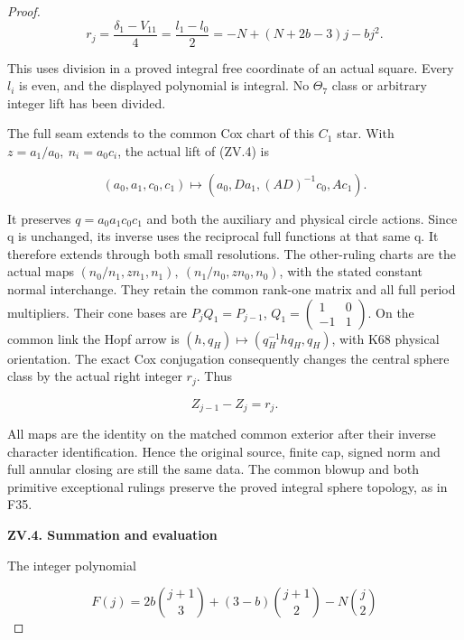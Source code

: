 \begin{proof}
\[
 r_j=\frac{\delta_1-V_{11}}4
       =\frac{l_1-l_0}{2}
       =-N+(N+2b-3)j-bj^2.                         \tag{ZV.11}
\]

This uses division in a proved integral free coordinate of an actual
square. Every \(l_i\) is even, and the displayed polynomial is integral.
No \(\Theta_7\) class or arbitrary integer lift has been divided.

The full seam extends to the common Cox chart of this \(C_1\) star.
With \(z=a_1/a_0,\ n_i=a_0c_i\), the actual lift of (ZV.4) is

\[
 (a_0,a_1,c_0,c_1)\mapsto
       (a_0,Da_1,(AD)^{-1}c_0,Ac_1).                \tag{ZV.12}
\]

It preserves \(q=a_0a_1c_0c_1\) and both the auxiliary and physical circle
actions. Since q is unchanged, its inverse uses the reciprocal full
functions at that same q. It therefore extends through both small
resolutions. The other-ruling charts are the actual maps
\((n_0/n_1,zn_1,n_1),\ (n_1/n_0,zn_0,n_0)\), with the stated constant
normal interchange. They retain the common rank-one matrix and all
full period multipliers. Their cone bases are \(P_jQ_1=P_{j-1}\),
\(Q_1=\left(\begin{smallmatrix}1&0\\-1&1\end{smallmatrix}\right)\). On the common link the Hopf arrow is
\((h,q_H)\mapsto(q_H^{-1}hq_H,q_H)\), with K68 physical orientation.
The exact Cox conjugation consequently changes the central sphere
class by the actual right integer \(r_j\). Thus

\[
                         Z_{j-1}-Z_j=r_j.          \tag{ZV.13}
\]

All maps are the identity on the matched common exterior after their
inverse character identification. Hence the original source, finite
cap, signed norm and full annular closing are still the same data.
The common blowup and both primitive exceptional rulings preserve
the proved integral sphere topology, as in F35.

\par

\medskip\noindent\textbf{ZV.4. Summation and evaluation}

\par\nopagebreak[4]

The integer polynomial

\[
 F(j)=2b\binom{j+1}{3}+(3-b)\binom{j+1}{2}
                                          -N\binom j2
\]


\end{proof}
